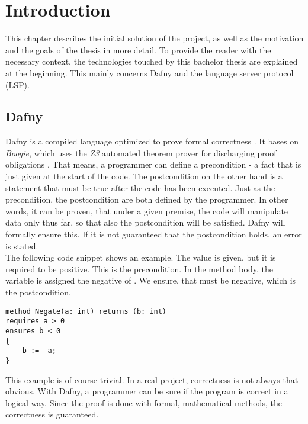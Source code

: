 \section{Introduction}

\label{section:introduction}
This chapter describes the initial solution of the project, as well as the motivation and the goals of the thesis in more detail.
To provide the reader with the necessary context, the technologies touched by this bachelor thesis are explained at the beginning.
This mainly concerns Dafny and the language server protocol (LSP).

\subsection{Dafny}
\label{section:introduction:dafny}
Dafny is a compiled language optimized to prove formal correctness \cite{dafnyWiki}.
It bases on \textit{Boogie}, which uses the \textit{Z3} automated theorem prover for discharging proof obligations \cite{dafnyWiki}.
That means, a programmer can define a precondition - a fact that is just given at the start of the code.
The postcondition on the other hand is a statement that must be true after the code has been executed.
Just as the precondition, the postcondition are both defined by the programmer.
In other words, it can be proven, that under a given premise, the code will manipulate data only thus far, so that also the postcondition will be satisfied.
Dafny will formally ensure this.
If it is not guaranteed that the postcondition holds, an error is stated.\\

The following code snippet shows an example.
The value  is given, but it is required to be positive.
This is the precondition.
In the method body, the variable  is assigned the negative of .
We ensure, that  must be negative, which is the postcondition.
\begin{lstlisting}[language=dafny, caption={Simple Dafny Example}, captionpos=b, label={lst:simpleDafnyExample}]
method Negate(a: int) returns (b: int)
requires a > 0
ensures b < 0
{
    b := -a;
}
\end{lstlisting}
This example is of course trivial.
In a real project, correctness is not always that obvious.
With Dafny, a programmer can be sure if the program is correct in a logical way.
Since the proof is done with formal, mathematical methods, the correctness is guaranteed.\\

